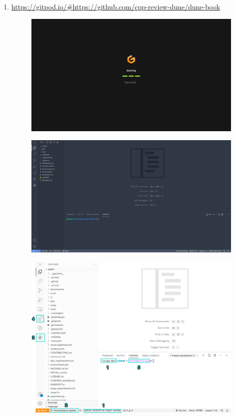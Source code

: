 \begin{enumerate}
	\item \url{https://gitpod.io/#https://github.com/cpp-review-dune/dune-book}
	      \begin{figure}[ht!]
		      \centering
		      \includegraphics[width=.6\paperwidth]{images/opening}
	      \end{figure}
	      \begin{figure}[ht!]
		      \centering
		      \includegraphics[width=.6\paperwidth]{images/editor}
	      \end{figure}
	      \begin{figure}[ht!]
		      \centering
		      \includegraphics[width=.6\paperwidth]{images/gitpod-workspace}

\end{figure}
\end{enumerate}
